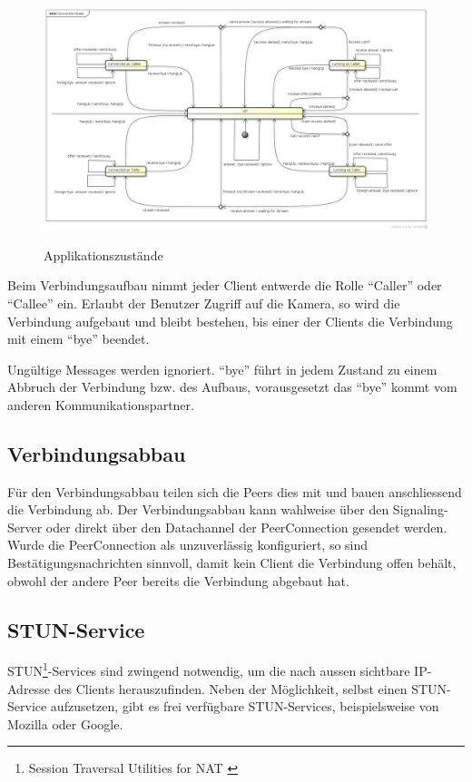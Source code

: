 		\begin{landscape}		
			\begin{figure}[H]
				\centering
				\includegraphics[height=0.7\textwidth]{../architekturanalayse/img/connectionState.png}
				\label{img:deployment}
				\caption{Applikationszustände}
			\end{figure}
			Beim Verbindungsaufbau nimmt jeder Client entwerde die Rolle "`Caller"' oder
			"`Callee"' ein. Erlaubt der Benutzer Zugriff auf die Kamera, so wird die
			Verbindung aufgebaut und bleibt bestehen, bis einer der Clients die Verbindung mit einem "`bye"' beendet.
			
			Ungültige Messages werden ignoriert. "`bye"' führt in jedem Zustand zu einem
			Abbruch der Verbindung bzw. des Aufbaus, vorausgesetzt das "`bye"'
			kommt vom anderen Kommunikationspartner.
		\end{landscape}
	
	\subsection{Verbindungsabbau}
		Für den Verbindungsabbau teilen sich die Peers dies mit und bauen anschliessend die Verbindung ab. Der Verbindungsabbau kann wahlweise über den Signaling-Server oder direkt über den Datachannel der PeerConnection gesendet werden. Wurde die PeerConnection als unzuverlässig konfiguriert, so sind Bestätigungsnachrichten sinnvoll, damit kein Client die Verbindung offen behält, obwohl der andere Peer bereits die Verbindung abgebaut hat.
	
	\subsection{STUN-Service}
		STUN\footnote{Session Traversal Utilities for NAT \cite{IETF-STUN-RFC}}-Services sind zwingend
		notwendig, um die nach aussen sichtbare IP-Adresse des Clients herauszufinden.
		Neben der Möglichkeit, selbst einen STUN-Service aufzusetzen, gibt es frei
		verfügbare STUN-Services, beispielsweise von Mozilla oder Google.

